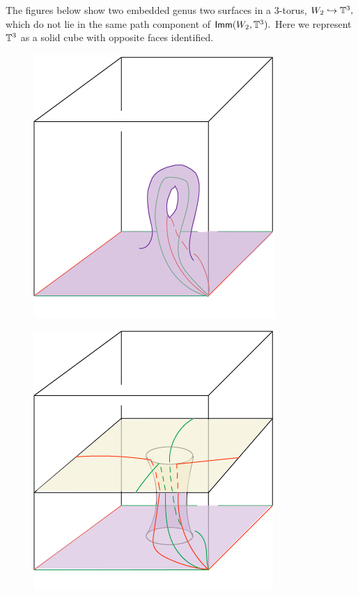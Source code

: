 The figures below show two embedded genus two surfaces in a 3-torus, $W_{2} \hookrightarrow \mathbb T^{3},$ which do not lie in the same path component of ${\sf Imm}(W_{2}, \mathbb T^{3}).$ Here we represent $\mathbb T^{3}$ as a solid cube with opposite faces identified.



\begin{figure}[h]
\centering
\begin{minipage}{.5\textwidth}
  \centering
  \includegraphics[width=.6\linewidth]{Wg2}
  \label{fig:test1}
\end{minipage}%
\begin{minipage}{.5\textwidth}
  \centering
  \includegraphics[width=.6\linewidth]{Wg1}
  \label{fig:test2}
\end{minipage}
\end{figure}

